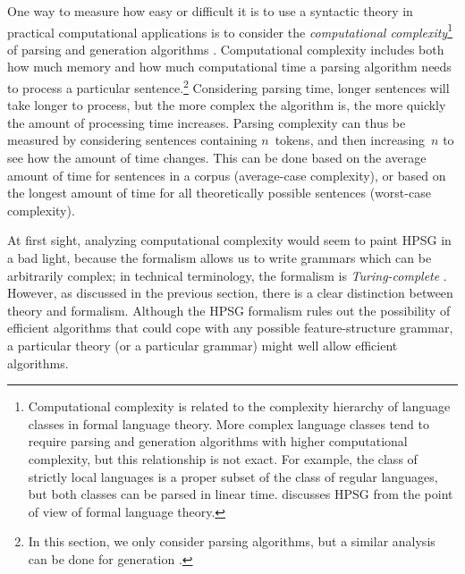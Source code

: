 \documentclass[output=paper,nonflat]{langsci/langscibook}
\begin{document}
One way to measure how easy or difficult it is
to use a syntactic theory in practical computational applications
is to consider the \textit{computational complexity}\footnote{%
	Computational complexity is related to
	the complexity hierarchy of language classes in formal language theory.
	More complex language classes tend to require
	parsing and generation algorithms with higher computational complexity,
	but this relationship is not exact.
	For example, the class of strictly local languages is a proper subset of the class of regular languages,
	but both classes can be parsed in linear time.
	\citet[ch.~17]{MuellerGT-Eng3} discusses HPSG from the point of view of formal language theory.
}
of parsing and generation algorithms \citep{gazdar1985complexity}.
Computational complexity includes both how much
memory and how much computational time 
a parsing algorithm needs to process a particular sentence.\footnote{%
  In this section, we only consider parsing
  algorithms, but a similar analysis can be done for generation
  \citep[\eg][]{carroll1999generate}.}
Considering parsing time, longer sentences will take longer to process,
but the more complex the algorithm is,
the more quickly the amount of processing time increases.
Parsing complexity can thus be measured by considering sentences containing $n$~tokens,
and then increasing~$n$ to see how the amount of time changes.
This can be done based on the average amount of time
for sentences in a corpus (average-case complexity),
or based on the longest amount of time
for all theoretically possible sentences (worst-case complexity).

At first sight, analyzing computational complexity
would seem to paint HPSG in a bad light,
because the formalism allows us to write grammars
which can be arbitrarily complex;
in technical terminology, the formalism is \textit{Turing-complete}
\citep[Section~3.4]{Johnson88}.
However, as discussed in the previous section,
there is a clear distinction between theory and formalism.
Although the HPSG formalism rules out the possibility of efficient algorithms
that could cope with any possible feature-structure grammar,
a particular theory (or a particular grammar) might well allow efficient algorithms.
\end{document}
